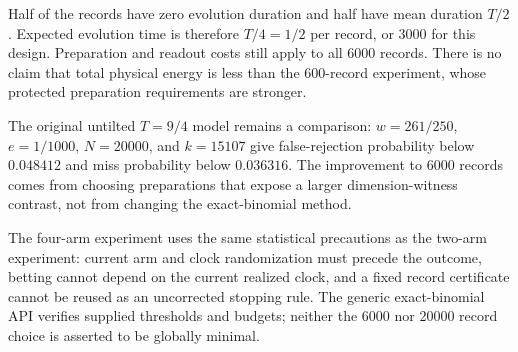Half of the records have zero evolution duration and half have mean
duration $T/2$. Expected evolution time is therefore $T/4=1/2$ per
record, or 3000 for this design. Preparation and readout costs still apply
to all 6000 records. There is no claim that total physical energy is less
than the 600-record experiment, whose protected preparation requirements
are stronger.

The original untilted $T=9/4$ model remains a comparison: $w=261/250$,
$e=1/1000$, $N=20000$, and $k=15107$ give false-rejection probability
below $0.048412$ and miss probability below $0.036316$. The improvement
to 6000 records comes from choosing preparations that expose a larger
dimension-witness contrast, not from changing the exact-binomial method.

The four-arm experiment uses the same statistical precautions as the
two-arm experiment: current arm and clock randomization must precede the
outcome, betting cannot depend on the current realized clock, and a fixed
record certificate cannot be reused as an uncorrected stopping rule.
The generic exact-binomial API verifies supplied thresholds and budgets;
neither the 6000 nor 20000 record choice is asserted to be globally minimal.
